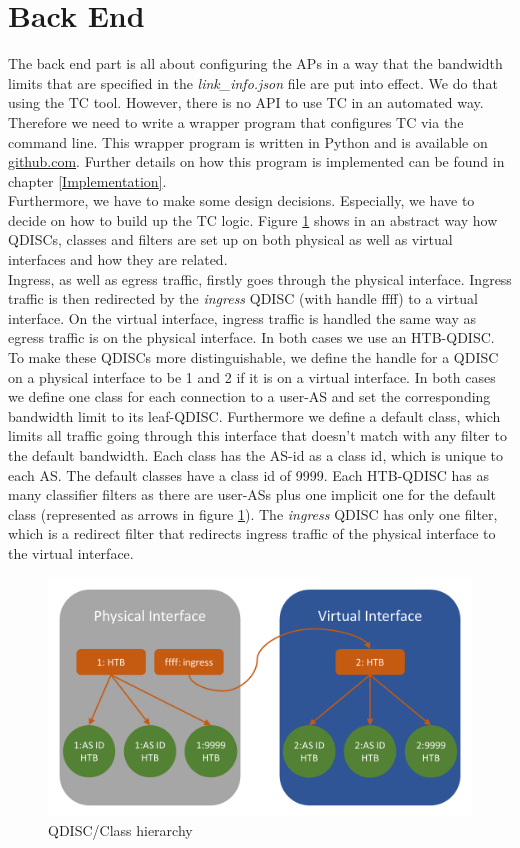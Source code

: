 \section{Back End}

The back end part is all about configuring the \acsp{AP} in a way that the bandwidth limits that are specified in the \textit{link\_info.json} file are put into effect. We do that using the \acs{TC} tool. However, there is no \acs{API} to use \acs{TC} in an automated way. Therefore we need to write a wrapper program that configures \acs{TC} via the command line. This wrapper program is written in Python and is available on \href{https://github.com/ManuelMeinen/SCIONLab_Bandwidth_Limiter}{github.com}\cite{meinen2019scionlabBwLimiter}. Further details on how this program is implemented can be found in chapter \ref{Implementation}.
\\
Furthermore, we have to make some design decisions. Especially, we have to decide on how to build up the \acs{TC} logic. Figure \ref{QDISC-Set-up} shows in an abstract way how \acsp{QDISC}, classes and filters are set up on both physical as well as virtual interfaces and how they are related.
\\
Ingress, as well as egress traffic, firstly goes through the physical interface. Ingress traffic is then redirected by the \textit{ingress} \acs{QDISC} (with handle ffff) to a virtual interface. On the virtual interface, ingress traffic is handled the same way as egress traffic is on the physical interface. In both cases we use an \acs{HTB}-\acs{QDISC}. To make these \acsp{QDISC} more distinguishable, we define the handle for a \acs{QDISC} on a physical interface to be 1 and 2 if it is on a virtual interface. In both cases we define one class for each connection to a user-\acs{AS} and set the corresponding bandwidth limit to its leaf-\acs{QDISC}. Furthermore we define a default class, which limits all traffic going through this interface that doesn't match with any filter to the default bandwidth. Each class has the \acs{AS}-id as a class id, which is unique to each \acs{AS}. The default classes have a class id of 9999. Each \acs{HTB}-\acs{QDISC} has as many classifier filters as there are user-\acsp{AS} plus one implicit one for the default class (represented as arrows in figure \ref{QDISC-Set-up}). The \textit{ingress} \acs{QDISC} has only one filter, which is a redirect filter that redirects ingress traffic of the physical interface to the virtual interface.
\begin{figure}[h]
	\centering
	\includegraphics[width=\textwidth]{img/QDISC-Set-up.png}
	\caption{QDISC/Class hierarchy}
	\label{QDISC-Set-up}
\end{figure}